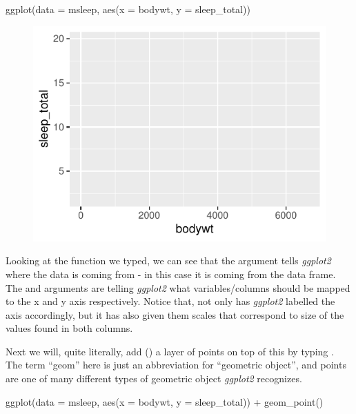 \begin{inR}
ggplot(data = msleep, aes(x = bodywt, y = sleep_total))
\end{inR}

\vspace{2em}

\begin{figure}[H]
\includegraphics[scale = 0.75]{graphics/ch2Figs/ggEx_1.pdf}
\label{fig:ggEx_1.pdf}
\end{figure}

\noindent
Looking at the  function we typed, we can see that the argument  tells \textit{ggplot2} where the data is coming from - in this case it is coming from the  data frame.  The  and  arguments are telling \textit{ggplot2} what variables/columns should be mapped to the x and y axis respectively.  Notice that, not only has \textit{ggplot2} labelled the axis accordingly, but it has also given them scales that correspond to size of the values found in both columns.

Next we will, quite literally, add (\R{+}) a layer of points on top of this by typing . The term ``geom'' here is just an abbreviation for ``geometric object'', and points are one of many different types of geometric object \textit{ggplot2} recognizes.

\begin{inR}
ggplot(data = msleep, aes(x = bodywt, y = sleep_total)) +
  geom_point()
\end{inR}

\vspace{2em}

